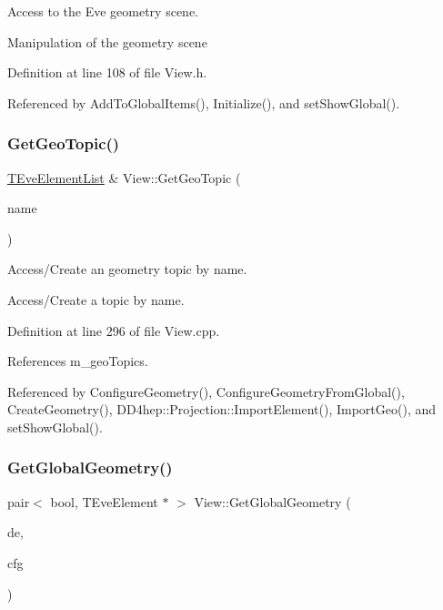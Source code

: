 Access to the Eve geometry scene. 

Manipulation of the geometry scene 

Definition at line 108 of file View.\+h.



Referenced by Add\+To\+Global\+Items(), Initialize(), and set\+Show\+Global().

\hypertarget{class_d_d4hep_1_1_view_a20af6b4597b0e51880186bc138bfe28e}{}\label{class_d_d4hep_1_1_view_a20af6b4597b0e51880186bc138bfe28e} 
\subsubsection{\texorpdfstring{Get\+Geo\+Topic()}{GetGeoTopic()}}
{\footnotesize\ttfamily \hyperlink{class_t_eve_element_list}{T\+Eve\+Element\+List} \& View\+::\+Get\+Geo\+Topic (\begin{DoxyParamCaption}\item[{const std\+::string \&}]{name }\end{DoxyParamCaption})\hspace{0.3cm}{\ttfamily [virtual]}}



Access/\+Create an geometry topic by name. 

Access/\+Create a topic by name. 

Definition at line 296 of file View.\+cpp.



References m\+\_\+geo\+Topics.



Referenced by Configure\+Geometry(), Configure\+Geometry\+From\+Global(), Create\+Geometry(), D\+D4hep\+::\+Projection\+::\+Import\+Element(), Import\+Geo(), and set\+Show\+Global().

\hypertarget{class_d_d4hep_1_1_view_aeb658c5dde010976060874d2ad48107f}{}\label{class_d_d4hep_1_1_view_aeb658c5dde010976060874d2ad48107f} 
\subsubsection{\texorpdfstring{Get\+Global\+Geometry()}{GetGlobalGeometry()}}
{\footnotesize\ttfamily pair$<$ bool, T\+Eve\+Element $\ast$ $>$ View\+::\+Get\+Global\+Geometry (\begin{DoxyParamCaption}\item[{\hyperlink{class_d_d4hep_1_1_view_a59eafc8150df21b918b964850ac6c462}{Det\+Element}}]{de,  }\item[{const \hyperlink{class_d_d4hep_1_1_display_configuration_1_1_config}{Display\+Configuration\+::\+Config} \&}]{cfg }\end{DoxyParamCaption})\hspace{0.3cm}{\ttfamily [virtual]}}



